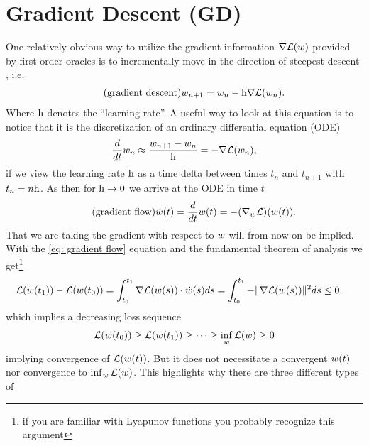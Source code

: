 
\chapter{Gradient Descent (GD)}\label{chap: gradient descent}

One relatively obvious way to utilize the gradient information
\(\nabla\mathcal{L}(w)\) provided by first order oracles is to incrementally
move in the direction of steepest descent
\parencite{cauchyMethodeGeneralePour1847}, i.e.
%
\begin{align}
	\label{eq: gradient descent}
	\tag{gradient descent}
	w_{n+1} = w_n - \text{h}\nabla \mathcal{L}(w_n).
\end{align}
%
Where \(\text{h}\) denotes the ``learning rate''. A useful way to look at this
equation is to notice that it is the discretization of an ordinary differential
equation (ODE)
%
\begin{align*}
	\frac{d}{dt}w_n \approx \frac{w_{n+1} - w_n}{\text{h}}
	= - \nabla \mathcal{L}(w_n),
\end{align*}
%
if we view the learning rate \(\text{h}\) as a time delta between times
\(t_n\) and \(t_{n+1}\) with \(t_n = n\text{h}\). As then for
\(\text{h}\to 0\) we arrive at the ODE in time \(t\)
%
\begin{align}\label{eq: gradient flow}
	\tag{gradient flow}
	\dot{w}(t) = \frac{d}{dt}w(t)= -(\nabla_w \mathcal{L})(w(t)).
\end{align}
%
That we are taking the gradient with respect to \(w\) will from now on be
implied. With the \ref{eq: gradient flow} equation and the fundamental theorem of
analysis we get\footnote{
	if you are familiar with Lyapunov functions you probably recognize this argument
}
%
\begin{align}\label{eq: gradient integral}
	\mathcal{L}(w(t_1)) - \mathcal{L}(w(t_0))
	&= \int_{t_0}^{t_1} \nabla \mathcal{L}(w(s)) \cdot \dot{w}(s) ds
	= \int_{t_0}^{t_1} -\|\nabla \mathcal{L}(w(s))\|^2 ds
	\le 0,
\end{align}
%
which implies a decreasing loss sequence
%
\begin{align*}
	\mathcal{L}(w(t_0)) \ge \mathcal{L}(w(t_1)) \ge \dots \ge \inf_w \mathcal{L}(w) \ge 0
\end{align*}
implying convergence of \(\mathcal{L}(w(t))\). But it does not necessitate a
convergent \(w(t)\) nor convergence to \(\inf_w
\mathcal{L}(w)\). This highlights why there are three different types of
